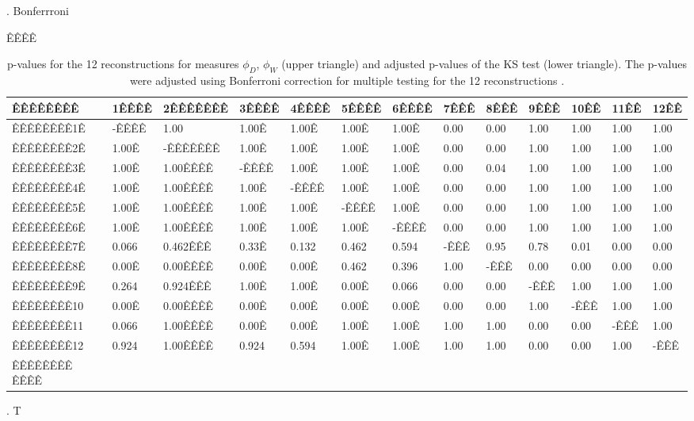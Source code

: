 \documentclass{iopart}
\begin{document}
. Bonferrroni
\begin{table}[h]
 \caption{p-values for the 12 reconstructions for measures $\phi_D$, $\phi_W$  (upper triangle) and  adjusted p-values of the KS test   (lower triangle). The p-values were adjusted using Bonferroni correction for multiple testing for the 12 reconstructions .}
ÊÊÊÊ\begin{tabular}{l|llllllllllll}
ÊÊÊÊÊÊÊÊ & 1ÊÊÊÊ & 2ÊÊÊÊÊÊÊ & 3ÊÊÊÊ & 4ÊÊÊÊ & 5ÊÊÊÊ & 6ÊÊÊÊ & 7ÊÊÊ & 8ÊÊÊ & 9ÊÊÊ & 10ÊÊ & 11ÊÊ & 12ÊÊ \\ \hline
ÊÊÊÊÊÊÊÊ1Ê & -ÊÊÊÊ &     1.00 & 1.00Ê & 1.00Ê & 1.00Ê & 1.00Ê &  0.00 &  0.00 & 1.00 & 1.00 & 1.00 & 1.00 \\ 
ÊÊÊÊÊÊÊÊ2Ê & 1.00Ê & -ÊÊÊÊÊÊÊ & 1.00Ê & 1.00Ê & 1.00Ê & 1.00Ê &  0.00 &  0.00 & 1.00 & 1.00 & 1.00 & 1.00 \\ 
ÊÊÊÊÊÊÊÊ3Ê & 1.00Ê & 1.00ÊÊÊÊ & -ÊÊÊÊ & 1.00Ê & 1.00Ê & 1.00Ê &  0.00 &  0.04 & 1.00 & 1.00 & 1.00 & 1.00 \\ 
ÊÊÊÊÊÊÊÊ4Ê & 1.00Ê & 1.00ÊÊÊÊ & 1.00Ê & -ÊÊÊÊ & 1.00Ê & 1.00Ê &  0.00 &  0.00 & 1.00 & 1.00 & 1.00 & 1.00 \\ 
ÊÊÊÊÊÊÊÊ5Ê & 1.00Ê & 1.00ÊÊÊÊ & 1.00Ê & 1.00Ê & -ÊÊÊÊ & 1.00Ê &  0.00 &  0.00 & 1.00 & 1.00 & 1.00 & 1.00 \\ 
ÊÊÊÊÊÊÊÊ6Ê & 1.00Ê & 1.00ÊÊÊÊ & 1.00Ê & 1.00Ê & 1.00Ê & -ÊÊÊÊ &  0.00 &  0.00 & 1.00 & 1.00 & 1.00 & 1.00 \\ 
ÊÊÊÊÊÊÊÊ7Ê & 0.066 & 0.462ÊÊÊ & 0.33Ê & 0.132 & 0.462 & 0.594 & -ÊÊÊ & 0.95 & 0.78 &  0.01 &  0.00 &  0.00 \\ 
ÊÊÊÊÊÊÊÊ8Ê & 0.00Ê &  0.00ÊÊÊÊ &  0.00Ê &  0.00Ê & 0.462 & 0.396 & 1.00 & -ÊÊÊ &  0.00 &  0.00 &  0.00 &  0.00 \\ 
ÊÊÊÊÊÊÊÊ9Ê & 0.264 & 0.924ÊÊÊ & 1.00Ê & 1.00Ê &  0.00Ê & 0.066 &  0.00 &  0.00 & -ÊÊÊ & 1.00 & 1.00 & 1.00 \\ 
ÊÊÊÊÊÊÊÊ10 &  0.00Ê &  0.00ÊÊÊÊ &  0.00Ê &  0.00Ê &  0.00Ê &  0.00Ê &  0.00 &  0.00 & 1.00 & -ÊÊÊ & 1.00 & 1.00 \\ 
ÊÊÊÊÊÊÊÊ11 & 0.066 & 1.00ÊÊÊÊ &  0.00Ê &  0.00Ê & 1.00Ê & 1.00Ê & 1.00 & 1.00 &  0.00 &  0.00 & -ÊÊÊ & 1.00 \\ 
ÊÊÊÊÊÊÊÊ12 & 0.924 & 1.00ÊÊÊÊ & 0.924 & 0.594 & 1.00Ê & 1.00Ê & 1.00 & 1.00 &  0.00 &  0.00 & 1.00 & -ÊÊÊ \\
ÊÊÊÊÊÊÊÊ
ÊÊÊÊ\end{tabular}

\label{table:Bonferroni-Correction}
\end{table}

. T

\medskip
\end{document}

